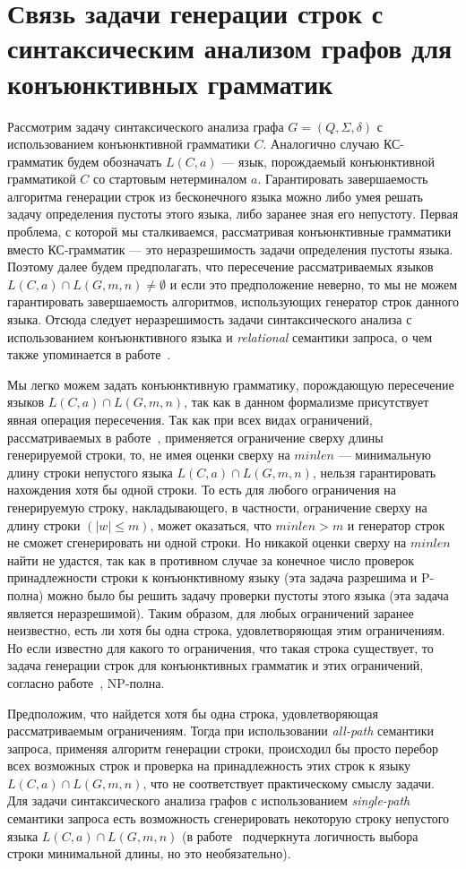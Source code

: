 \section{Связь задачи генерации строк с синтаксическим анализом графов для конъюнктивных грамматик}

Рассмотрим задачу синтаксического анализа графа $G = (Q, \Sigma, \delta)$ с использованием конъюнктивной грамматики $C$. Аналогично случаю КС-грамматик будем обозначать $L(C,a)$ --- язык, порождаемый конъюнктивной грамматикой $C$ со стартовым нетерминалом $a$. Гарантировать завершаемость алгоритма генерации строк из бесконечного языка можно либо умея решать задачу определения пустоты этого языка, либо заранее зная его непустоту. Первая проблема, с которой мы сталкиваемся, рассматривая конъюнктивные грамматики вместо КС-грамматик --- это неразрешимость задачи определения пустоты языка. Поэтому далее будем предполагать, что пересечение рассматриваемых языков $L(C,a) \cap L(G,m,n) \ne \emptyset$ и если это предположение неверно, то мы не можем гарантировать завершаемость алгоритмов, использующих генератор строк данного языка. Отсюда следует неразрешимость задачи синтаксического анализа с использованием конъюнктивного языка и \textit{relational} семантики запроса, о чем также упоминается в работе~\cite{azimov-spbu-hellings1}.

Мы легко можем задать конъюнктивную грамматику, порождающую пересечение языков $L(C,a) \cap L(G,m,n)$, так как в данном формализме присутствует явная операция пересечения. Так как при всех видах ограничений, рассматриваемых в работе~\cite{azimov-spbu-Okhotin}, применяется ограничение сверху длины генерируемой строки, то, не имея оценки сверху на $minlen$ --- минимальную длину строки непустого языка $L(C,a) \cap L(G,m,n)$, нельзя гарантировать нахождения хотя бы одной строки. То есть для любого ограничения на генерируемую строку, накладывающего, в частности, ограничение сверху на длину строки $(|w| \le m)$, может оказаться, что $minlen > m$ и генератор строк не сможет сгенерировать ни одной строки. Но никакой оценки сверху на $minlen$ найти не удастся, так как в противном случае за конечное число проверок принадлежности строки к конъюнктивному языку (эта задача разрешима и P-полна) можно было бы решить задачу проверки пустоты этого языка (эта задача является неразрешимой). Таким образом, для любых ограничений заранее неизвестно, есть ли хотя бы одна строка, удовлетворяющая этим ограничениям. Но если известно для какого то ограничения, что такая строка существует, то задача генерации строк для конъюнктивных грамматик и этих ограничений, согласно работе~\cite{azimov-spbu-Okhotin}, NP-полна.

Предположим, что найдется хотя бы одна строка, удовлетворяющая рассматриваемым ограничениям. Тогда при использовании \textit{all-path} семантики запроса, применяя алгоритм генерации строки, происходил бы просто перебор всех возможных строк и проверка на принадлежность этих строк к языку $L(C,a) \cap L(G,m,n)$, что не соответствует практическому смыслу задачи. Для задачи синтаксического анализа графов с использованием \textit{single-path} семантики запроса есть возможность сгенерировать некоторую строку непустого языка $L(C,a) \cap L(G,m,n)$ (в работе~\cite{azimov-spbu-hellings2} подчеркнута логичность выбора строки минимальной длины, но это необязательно).
